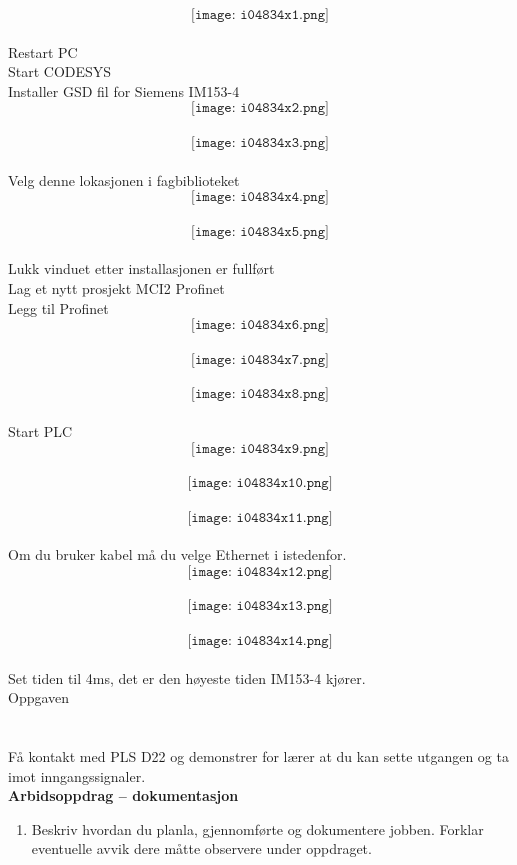 $$\texttt{[image: i04834x1.png]}$$\\
Restart PC \\
Start CODESYS \\
Installer GSD fil for Siemens IM153-4 \\
$$\texttt{[image: i04834x2.png]}$$\\
$$\texttt{[image: i04834x3.png]}$$\\
Velg denne lokasjonen i fagbiblioteket \\
$$\texttt{[image: i04834x4.png]}$$\\
$$\texttt{[image: i04834x5.png]}$$\\
Lukk vinduet etter installasjonen er fullført \\
Lag et nytt prosjekt MCI2 Profinet  \\
Legg til Profinet \\
$$\texttt{[image: i04834x6.png]}$$\\
$$\texttt{[image: i04834x7.png]}$$\\
$$\texttt{[image: i04834x8.png]}$$\\
Start PLC \\
$$\texttt{[image: i04834x9.png]}$$\\
$$\texttt{[image: i04834x10.png]}$$\\
$$\texttt{[image: i04834x11.png]}$$\\
Om du bruker kabel må du velge Ethernet i istedenfor.  \\
$$\texttt{[image: i04834x12.png]}$$\\
$$\texttt{[image: i04834x13.png]}$$\\
$$\texttt{[image: i04834x14.png]}$$\\
Set tiden til 4ms, det er den høyeste tiden IM153-4 kjører. \\
Oppgaven \\
\\
						     \\

Få kontakt med PLS D22 og demonstrer for lærer at du kan sette utgangen og ta imot inngangssignaler.\\
\textbf{Arbidsoppdrag -- dokumentasjon}\\

\begin{enumerate}
	\item Beskriv hvordan du planla, gjennomførte og dokumentere jobben. Forklar eventuelle avvik dere måtte observere under oppdraget. 
\end{enumerate}



























